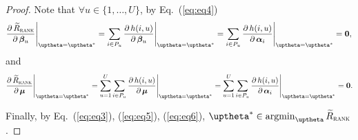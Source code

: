 \begin{proof}
Note that $\forall u \in \{1,\dots,U\}$,
by Eq.~(\ref{eq:eq4})
\begin{equation}
\label{eq:eq5}
\frac{\partial \, \widetilde R_\textsc{rank}} {\partial \, \betabm_u} \Bigg|_{\uptheta = \uptheta^*} 
= \sum_{i \in P_u} \frac{\partial \, h(i, u)}{\partial \, \betabm_u}  \Bigg|_{\uptheta = \uptheta^*}
= \sum_{i \in P_u} \frac{\partial \, h(i, u)}{\partial \, \alphabm_i} \Bigg|_{\uptheta = \uptheta^*}
= \zero,
\end{equation}
and
\begin{equation}
\label{eq:eq6}
\frac{\partial \, \widetilde R_\textsc{rank}} {\partial \, \bmu} \Bigg|_{\uptheta = \uptheta^*} 
= \sum_{u=1}^U \sum_{i \in P_u} \frac{\partial \, h(i, u)}{\partial \, \bmu} \Bigg|_{\uptheta = \uptheta^*}
= \sum_{u=1}^U \sum_{i \in P_u} \frac{\partial \, h(i, u)}{\partial \, \alphabm_i} \Bigg|_{\uptheta = \uptheta^*}
= \zero.
\end{equation}

Finally, by Eq.~(\ref{eq:eq3}), (\ref{eq:eq5}), (\ref{eq:eq6}), $\uptheta^* \in \argmin_{\uptheta} \widetilde R_\textsc{rank}$.

\end{proof}
